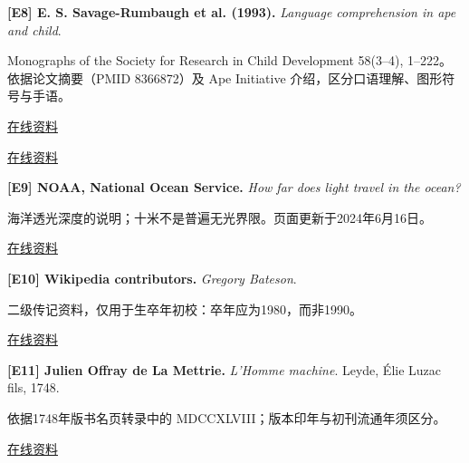 \par\noindent\begin{minipage}{\linewidth}
\label{ref-8}\noindent\textbf{[E8] E. S. Savage-Rumbaugh et al. (1993).} \textit{Language comprehension in ape and child}.\par\nobreak
Monographs of the Society for Research in Child Development 58(3–4), 1–222。依据论文摘要（PMID 8366872）及 Ape Initiative 介绍，区分口语理解、图形符号与手语。\par
{\small\href{https://pubmed.ncbi.nlm.nih.gov/8366872/}{在线资料}}\par {\small\href{https://www.apeinitiative.org/kanzi}{在线资料}}\par
\par\end{minipage}\par

\par\noindent\begin{minipage}{\linewidth}
\label{ref-9}\noindent\textbf{[E9] NOAA, National Ocean Service.} \textit{How far does light travel in the ocean?}\par\nobreak
海洋透光深度的说明；十米不是普遍无光界限。页面更新于2024年6月16日。\par
{\small\href{https://oceanservice.noaa.gov/facts/light_travel.html}{在线资料}}\par
\par\end{minipage}\par

\par\noindent\begin{minipage}{\linewidth}
\label{ref-10}\noindent\textbf{[E10] Wikipedia contributors.} \textit{Gregory Bateson}.\par\nobreak
二级传记资料，仅用于生卒年初校：卒年应为1980，而非1990。\par
{\small\href{https://en.wikipedia.org/wiki/Gregory_Bateson}{在线资料}}\par
\par\end{minipage}\par

\par\noindent\begin{minipage}{\linewidth}
\label{ref-11}\noindent\textbf{[E11] Julien Offray de La Mettrie.} \textit{L’Homme machine}. Leyde, Élie Luzac fils, 1748.\par\nobreak
依据1748年版书名页转录中的 MDCCXLVIII；版本印年与初刊流通年须区分。\par
{\small\href{https://fr.wikisource.org/wiki/L’Homme_machine_(1748)}{在线资料}}\par
\par\end{minipage}\par

